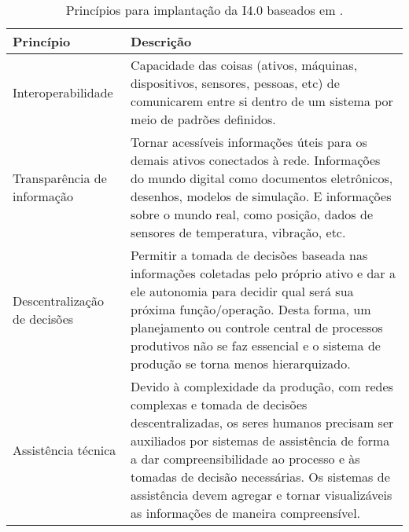 \begin{table}[htb]
	\centering
	\footnotesize
	\caption{Princípios para implantação da I4.0 baseados em .}
	\label{tab:principios-i4}
	\begin{tabular}{p{3cm}p{12cm}}
		\hline
		\textbf{Princípio}           & \textbf{Descrição}                                                                                                                                                                                                                                                                                                              \\

		\hline
		Interoperabilidade           &
		Capacidade das coisas (ativos, máquinas, dispositivos, sensores, pessoas, etc) de comunicarem entre si dentro de um sistema por meio de padrões definidos.                                                                                                                                                                                                     \\

		\hline
		Transparência de informação  &
		Tornar acessíveis informações úteis para os demais ativos conectados à rede. Informações do mundo digital como documentos eletrônicos, desenhos, modelos de simulação. E informações sobre o mundo real, como posição, dados de sensores de temperatura, vibração, etc.                                                                                        \\

		\hline
		Descentralização de decisões &
		Permitir a tomada de decisões baseada nas informações coletadas pelo próprio ativo e dar a ele autonomia para decidir qual será sua próxima função/operação. Desta forma, um planejamento ou controle central de processos produtivos não se faz essencial e o sistema de produção se torna menos hierarquizado.                                               \\

		\hline
		Assistência técnica          &
		Devido à complexidade da produção, com redes complexas e tomada de decisões descentralizadas, os seres humanos precisam ser auxiliados por sistemas de assistência de forma a dar compreensibilidade ao processo e às tomadas de decisão necessárias. Os sistemas de assistência devem agregar e tornar visualizáveis as informações de maneira compreensível. \\

		\hline
	\end{tabular}
\end{table}

